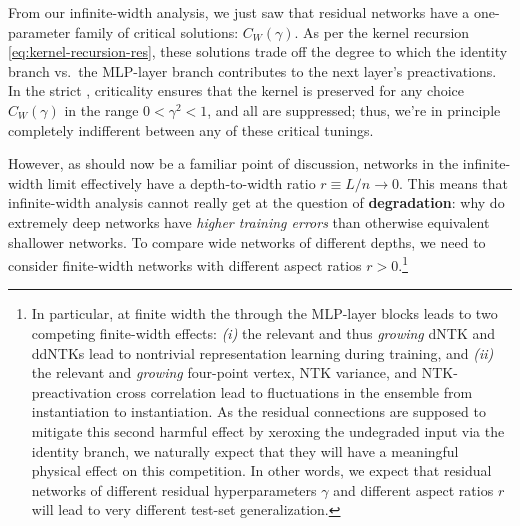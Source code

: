 From our infinite-width analysis, we just saw that residual networks have a one-parameter family of critical solutions: $C_W(\gamma)$. As per the kernel recursion \eqref{eq:kernel-recursion-res}, these solutions trade off the degree to which the identity branch vs.~the MLP-layer branch contributes to the next layer's preactivations. In the strict , criticality ensures that the kernel is preserved for any choice $C_W(\gamma)$ in the range $0 < \gamma^2 <1$, and all  are suppressed; thus, we're in principle completely indifferent between any of these critical tunings.

However, as should now be a familiar point of discussion, networks in the infinite-width limit effectively have a depth-to-width ratio $r\equiv L/n \to 0$. This means that infinite-width analysis cannot really get at the question of \textbf{degradation}: why do extremely deep networks have  \emph{higher training errors} than otherwise equivalent shallower networks. 
To compare wide networks of different depths, we need to consider finite-width networks with different aspect ratios $r > 0$.\footnote{
In particular, at finite width the  through the MLP-layer blocks leads to two competing finite-width effects: \emph{(i)}
 the relevant and thus \emph{growing} dNTK and ddNTKs lead to nontrivial representation learning during training,
and \emph{(ii)} the relevant and \emph{growing} four-point vertex, NTK variance, and NTK-preactivation cross correlation lead to fluctuations in the ensemble from instantiation to instantiation.
As the residual connections are supposed to mitigate this second harmful effect by xeroxing the undegraded input via the identity branch, we naturally expect that they will have a meaningful physical effect on this competition.
In other words, we expect that residual networks of different residual hyperparameters $\gamma$ and  different aspect ratios $r$ will lead to very different test-set generalization.
}










